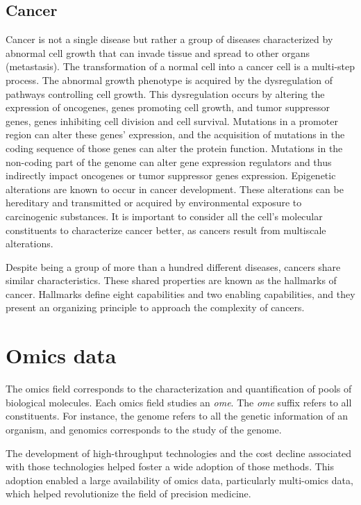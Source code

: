 \documentclass[../main.tex]{subfiles}
\begin{document}
 \subsection{Cancer}
	 Cancer is not a single disease but rather a group of diseases characterized by abnormal cell growth that can invade tissue and spread to other organs (metastasis).
	 The transformation of a normal cell into a cancer cell is a multi-step process.
	 The abnormal growth phenotype is acquired by the dysregulation of pathways controlling cell growth.
	 This dysregulation occurs by altering the expression of oncogenes, genes promoting cell growth, and tumor suppressor genes, genes inhibiting cell division and cell survival.
	 Mutations in a promoter region can alter these genes' expression, and the acquisition of mutations in the coding sequence of those genes can alter the protein function.
	 Mutations in the non-coding part of the genome can alter gene expression regulators and thus indirectly impact oncogenes or tumor suppressor genes expression.
	 Epigenetic alterations are known to occur in cancer development.
	 These alterations can be hereditary and transmitted or acquired by environmental exposure to carcinogenic substances.
	 It is important to consider all the cell's molecular constituents to characterize cancer better, as cancers result from multiscale alterations.

	 Despite being a group of more than a hundred different diseases, cancers share similar characteristics.
	 These shared properties are known as the hallmarks of cancer.
	 Hallmarks define eight capabilities and two enabling capabilities, and they present an organizing principle to approach the complexity of cancers.

\section{Omics data}
 The omics field corresponds to the characterization and quantification of pools of biological molecules.
 Each omics field studies an \textit{ome}.
 The \textit{ome} suffix refers to all constituents.
 For instance, the genome refers to all the genetic information of an organism, and genomics corresponds to the study of the genome.

 The development of high-throughput technologies and the cost decline associated with those technologies helped foster a wide adoption of those methods.
 This adoption enabled a large availability of omics data, particularly multi-omics data, which helped revolutionize the field of precision medicine.
\end{document}
